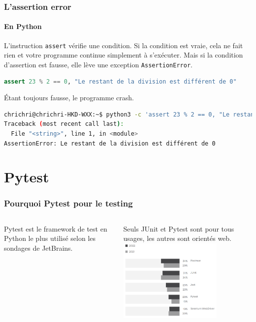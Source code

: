 \documentclass{beamer}
\begin{document}
    \begin{frame}[fragile]
        \frametitle{L'assertion error}
        \framesubtitle{En Python}
        \transdissolve
        L’instruction \lstinline{assert} vérifie une condition.
        Si la condition est vraie, cela ne fait rien et votre programme continue simplement à s’exécuter. Mais si la condition d’assertion est fausse, elle lève une exception \lstinline{AssertionError}.
        \begin{lstlisting}[language=Python]
assert 23 % 2 == 0, "Le restant de la division est différent de 0"
        \end{lstlisting}
        Étant toujours fausse, le programme crash.
        \begin{lstlisting}[language=sh]
chrichri@chrichri-HKD-WXX:~$ python3 -c 'assert 23 % 2 == 0, "Le restant de la division est différent de 0"'
Traceback (most recent call last):
  File "<string>", line 1, in <module>
AssertionError: Le restant de la division est différent de 0
        \end{lstlisting}
    \end{frame}


    \section{Pytest}
    \begin{frame}
        \frametitle{Pourquoi Pytest pour le testing}
        \transdissolve
        \begin{columns}
            Pytest est le framework de test en Python le plus utilisé selon les sondages de JetBrains\footnotemark.

            Seuls JUnit et Pytest sont pour tous usages, les autres sont orientés web.
            \centering
            \includegraphics[width=5cm]{image/jetbrains-survey-testing-framework.png}
        \end{columns}

    \end{frame}
\end{document}
